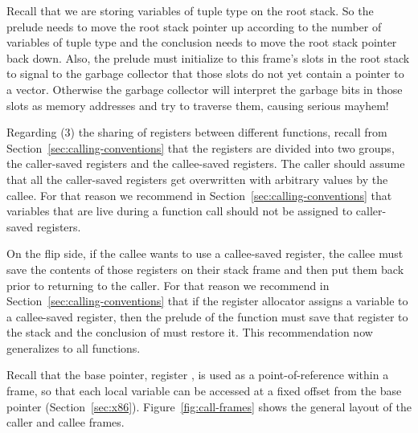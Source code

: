 \documentclass[7x10,nocrop]{TimesAPriori_MIT}%
\begin{document}
Recall that we are storing variables of tuple type on the root stack.
So the prelude needs to move the root stack pointer  up
according to the number of variables of tuple type and
the conclusion needs to move the root stack pointer back down.  Also,
the prelude must initialize to  this frame's slots in the root
stack to signal to the garbage collector that those slots do not yet
contain a pointer to a vector. Otherwise the garbage collector will
interpret the garbage bits in those slots as memory addresses and try
to traverse them, causing serious mayhem!

Regarding (3) the sharing of registers between different functions,
recall from Section~\ref{sec:calling-conventions} that the registers
are divided into two groups, the caller-saved registers and the
callee-saved registers. The caller should assume that all the
caller-saved registers get overwritten with arbitrary values by the
callee. For that reason we recommend in
Section~\ref{sec:calling-conventions} that variables that are live
during a function call should not be assigned to caller-saved
registers.

On the flip side, if the callee wants to use a callee-saved register,
the callee must save the contents of those registers on their stack
frame and then put them back prior to returning to the caller.  For
that reason we recommend in Section~\ref{sec:calling-conventions} that if
the register allocator assigns a variable to a callee-saved register,
then the prelude of the  function must save that register
to the stack and the conclusion of  must restore it.  This
recommendation now generalizes to all functions.

Recall that the base pointer, register , is used as a
point-of-reference within a frame, so that each local variable can be
accessed at a fixed offset from the base pointer
(Section~\ref{sec:x86}).
%
Figure~\ref{fig:call-frames} shows the general layout of the caller
and callee frames.
\end{document}
